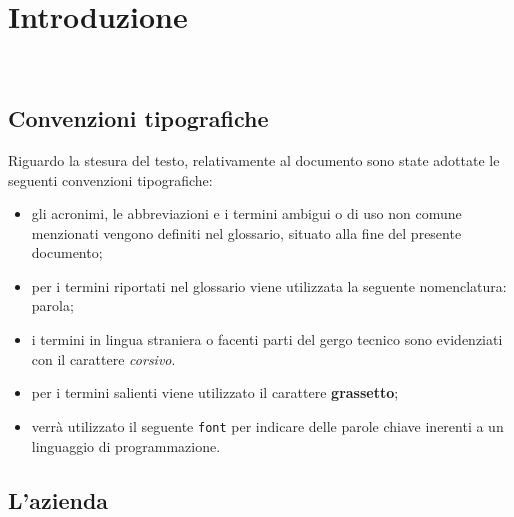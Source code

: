 \chapter{Introduzione}
\label{cap:introduzione}

\\





\section{Convenzioni tipografiche}
\label{sec:convenzioni-tipografiche}

Riguardo la stesura del testo, relativamente al documento sono state adottate le seguenti convenzioni tipografiche:
\begin{itemize}
	\item gli acronimi, le abbreviazioni e i termini ambigui o di uso non comune menzionati vengono definiti nel glossario, situato alla fine del presente documento;
	\item per i termini riportati nel glossario viene utilizzata la seguente nomenclatura: parola\glsoccur;
	\item i termini in lingua straniera o facenti parti del gergo tecnico sono evidenziati con il carattere \emph{corsivo}.
	\item per i termini salienti viene utilizzato il carattere \textbf{grassetto};
	\item verrà utilizzato il seguente \lstinline{font} per indicare delle parole chiave inerenti a un linguaggio di programmazione.
\end{itemize}

\section{L'azienda}
\label{sec:azienda}

